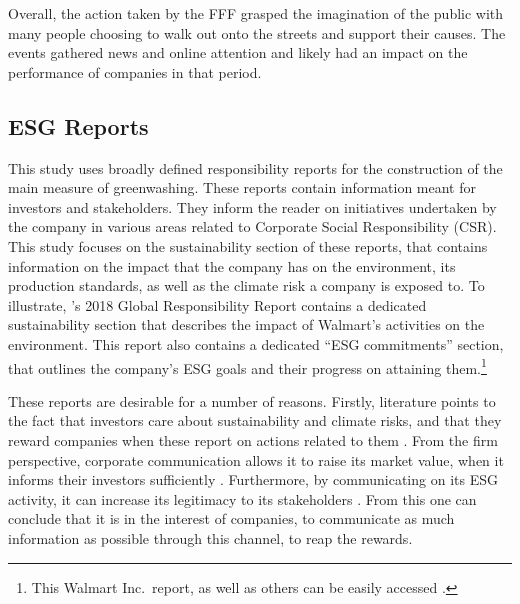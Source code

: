 \documentclass[12pt]{article}
\begin{document}
Overall, the action taken by the FFF grasped the imagination of the public with many people choosing to walk out onto the streets and support their causes. The events gathered news and online attention and likely had an impact on the performance of companies in that period.


\subsection{ESG Reports}


This study uses broadly defined responsibility reports for the construction of the main measure of greenwashing. These reports contain information meant for investors and stakeholders. They inform the reader on initiatives undertaken by the company in various areas related to Corporate Social Responsibility (CSR). This study focuses on the sustainability section of these reports, that contains information on the impact that the company has on the environment, its production standards, as well as the climate risk a company is exposed to. To illustrate, \citeauthor{walmart2018csr}'s 2018 Global Responsibility Report contains a dedicated sustainability section that describes the impact of Walmart's activities on the environment. This report also contains a dedicated ``ESG commitments'' section, that outlines the company's ESG goals and their progress on attaining them.\footnote{This Walmart Inc.~report, as well as others can be easily accessed \href{https://www.responsibilityreports.com/Company/walmart-inc}{}.}

These reports are desirable for a number of reasons. Firstly, literature points to the fact that investors care about sustainability and climate risks, and that they reward companies when these report on actions related to them \parencite{ilhanClimateRiskDisclosure2023,kruegerImportanceClimateRisks2020,pastorSustainableInvestingEquilibrium2021,testaDoesItPay2018}. From the firm perspective, corporate communication allows it to raise its market value, when it informs their investors sufficiently \parencite{servaesImpactCorporateSocial2013}. Furthermore, by communicating on its ESG activity, it can increase its legitimacy to its stakeholders \parencite{torelliGreenwashingEnvironmentalCommunication2020}. From this one can conclude that it is in the interest of companies, to communicate as much information as possible through this channel, to reap the rewards. 
\end{document}
